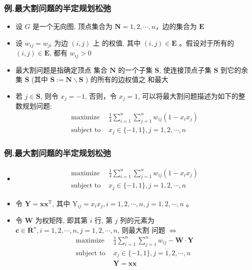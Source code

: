 \documentclass[handout]{beamer}
\begin{document}
\begin{frame}
	\begin{frame}
		\frametitle{例.最大割问题的半定规划松弛}
		
		\begin{itemize}
			\item  
			设 $G$ 是一个无向图, 顶点集合为 $\mathbf{N}=1,2, \cdots, n$，边的集合为 $\mathbf{E}$ 
			\item 
			设 $w_{i j}=w_{j i}$ 为边 $(i, j)$ 上 的权值, 其中 $(i, j) \in \mathbf{E}$ 。假设对于所有的 $(i, j) \in \mathbf{E}$, 都有 $w_{i j}>0$ 
			
			\item 最大割问题是指确定顶点 集合 $\mathbf{N}$ 的一个子集 $\mathbf{S}$, 使连接顶点子集 $\mathbf{S}$ 到它的余集 $\overline{\mathbf{S}}$ (其中 $\overline{\mathbf{S}}:=\boldsymbol{N} \backslash \mathbf{S}$ ) 的所有的边权值之 和最大 
			
			\item 
			若 $j \in \mathbf{S}$, 则令 $x_j=-1$, 否则，令 $x_j=1$, 可以将最大割问题描述为如下的整数规划问题: 
			$$
			\begin{array}{ll}
				\text { maximize } & \frac{1}{4} \sum_{i=1}^n \sum_{j=1}^n w_{i j}\left(1-x_i x_j\right) \\
				\text { subject to } & x_j \in\{-1,1\}, j=1,2, \cdots, n
			\end{array}
			$$
			
			
		\end{itemize}
		
	\end{frame}
	
	
	\begin{frame}
		\frametitle{例.最大割问题的半定规划松弛}
		
		\begin{itemize}
			\item 		$$
			\begin{array}{ll}
				\text { maximize } & \frac{1}{4} \sum_{i=1}^n \sum_{j=1}^n w_{i j}\left(1-x_i x_j\right) \\
				\text { subject to } & x_j \in\{-1,1\}, j=1,2, \cdots, n
			\end{array}
			$$
			
			\item 	令 $\boldsymbol{Y}=\boldsymbol{x} \boldsymbol{x}^{\mathrm{T}}$, 其中 $\mathrm{Y}_{i j}=x_i x_j, i=1,2, \cdots, n, j=1,2, \cdots, n$ 。 
			
			\item 令 $\boldsymbol{W}$ 为权矩阵, 即其第 $i$ 行, 第 $j$ 列的元素为 $\boldsymbol{c} \in \mathbf{R}^n, i=1,2, \cdots, n, j=1,2, \cdots, n$, 则最大割 问题 $\Leftrightarrow$
			$$
			\begin{array}{ll}
				\text { maximize } & \frac{1}{4} \sum_{i=1}^n \sum_{j=1}^n w_{i j}-\boldsymbol{W} \cdot \boldsymbol{Y} \\
				\text { subject to } & x_j \in\{-1,1\}, j=1,2, \cdots, n \\
				& \boldsymbol{Y}=\boldsymbol{x x}
			\end{array}
			$$
			

\end{itemize}
\end{frame}
\end{frame}
\end{document}
